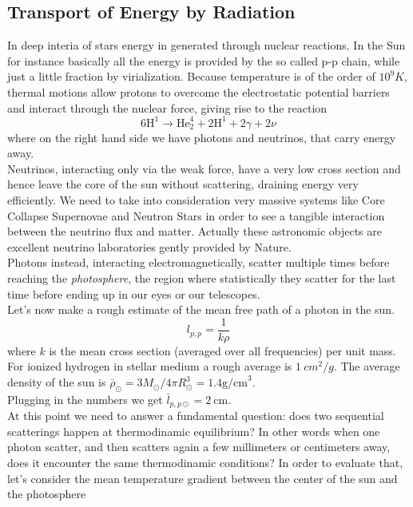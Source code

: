 \documentclass[11pt]{article}
\numberwithin{equation}{section}
\begin{document}
\subsection{Transport of Energy by Radiation}
In deep interia of stars energy in generated through nuclear reactions. In the Sun for instance basically all the energy is provided by the so called p-p chain, while just a little fraction by virialization. Because temperature is of the order of $10^9 K$, thermal motions allow protons to overcome the electrostatic potential barriers and interact through the nuclear force, giving rise to the reaction
\begin{equation}\label{ppchain}
	6 \mathrm{H}^1 \to \mathrm{He}^4_2 + 2 \mathrm{H}^1 + 2 \gamma + 2 \nu
\end{equation}
where on the right hand side we have photons and neutrinos, that carry energy away. \\
Neutrinos, interacting only via the weak force, have a very low cross section and hence leave the core of the sun without scattering, draining energy very efficiently. We need to take into consideration very massive systems like Core Collapse Supernovae and Neutron Stars in order to see a tangible interaction between the neutrino flux and matter. Actually these astronomic objects are excellent neutrino laboratories gently provided by Nature. \\
Photons instead, interacting electromagnetically, scatter multiple times before reaching the \textit{photosphere}, the region where statistically they scatter for the last time before ending up in our eyes or our telescopes. \\
Let's now make a rough estimate of the mean free path of a photon in the sun. 
\begin{equation}\label{mfp}
	l_{p,p}=\frac{1}{k \rho}
\end{equation}
where $k$ is the mean cross section (averaged over all frequencies) per unit mass. For ionized hydrogen in stellar medium a rough average is $1 \ cm^2/g$. The average density of the sun is $\bar\rho_{\odot}=3M_{\odot}/4 \pi R_{\odot}^3= 1.4 \mathrm{g /cm}^3$. \\
Plugging in the numbers we get $\bar l_{p,p \odot}=2 \  \mathrm{cm}$. \\
At this point we need to answer a fundamental question: does two sequential scatterings happen at thermodinamic equilibrium? In other words when one photon scatter, and then scatters again a few millimeters or centimeters away, does it encounter the same thermodinamic conditions? In order to evaluate that, let's consider the mean temperature gradient between the center of the sun and the photosphere
\end{document}
